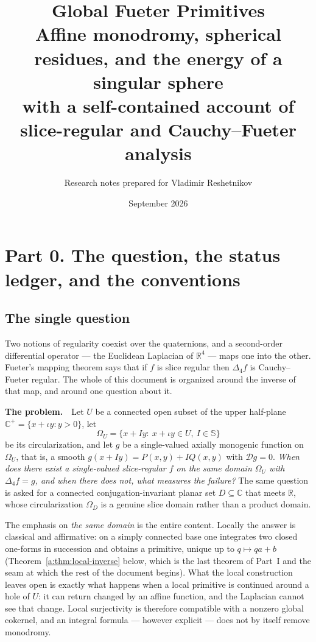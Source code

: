 \documentclass[11pt,a4paper]{article}
\title{\textbf{Global Fueter Primitives}\\[4pt]
\large Affine monodromy, spherical residues, and the energy of a singular
sphere\\[2pt]
\normalsize with a self-contained account of slice-regular and
Cauchy--Fueter analysis}
\author{Research notes prepared for Vladimir Reshetnikov}
\date{September 2026}
\numberwithin{equation}{section}
\theoremstyle{definition}
\theoremstyle{remark}
\theoremstyle{plain}
\newcommand{\RR}{\mathbb R}
\newcommand{\CC}{\mathbb C}
\newcommand{\SSS}{\mathbb S}
\newcommand{\Cplus}{\CC^{+}}
\newcommand{\Dop}{\mathcal D}
\newcommand{\lap}{\Delta_4}
\newcommand{\Om}{\Omega}
\begin{document}
\maketitle
\setcounter{tocdepth}{2}
\tableofcontents
\clearpage



\section{Part 0. The question, the status ledger, and the conventions}
\label{a:sec:front}

\subsection{The single question}
\label{a:sec:question}

Two notions of regularity coexist over the quaternions, and a second-order
differential operator --- the Euclidean Laplacian of $\RR^4$ --- maps one into
the other. Fueter's mapping theorem says that if $f$ is slice regular then
$\lap f$ is Cauchy--Fueter regular. The whole of this document is organized
around the inverse of that map, and around one question about it.

\medskip
\noindent\textbf{The problem.}\ \ Let $U$ be a connected open subset of the
upper half-plane $\Cplus=\{x+\iota y: y>0\}$, let
\[
 \Om_U=\{x+Iy:\ x+\iota y\in U,\ I\in\SSS\}
\]
be its circularization, and let $g$ be a single-valued axially monogenic
function on $\Om_U$, that is, a smooth $g(x+Iy)=P(x,y)+IQ(x,y)$ with
$\Dop g=0$. \emph{When does there exist a single-valued slice-regular $f$ on
the same domain $\Om_U$ with $\lap f=g$, and when there does not, what
measures the failure?} The same question is asked for a connected
conjugation-invariant planar set $D\subseteq\CC$ that meets $\RR$, whose
circularization $\Om_D$ is a genuine slice domain rather than a product
domain.

\medskip
The emphasis on \emph{the same domain} is the entire content. Locally the
answer is classical and affirmative: on a simply connected base one integrates
two closed one-forms in succession and obtains a primitive, unique up to
$q\mapsto qa+b$ (Theorem~\ref{a:thm:local-inverse} below, which is the last
theorem of Part~I and the seam at which the rest of the document begins).
What the local construction leaves open is exactly what happens when a local
primitive is continued around a hole of $U$: it can return changed by an
affine function, and the Laplacian cannot see that change. Local surjectivity
is therefore compatible with a nonzero global cokernel, and an integral
formula --- however explicit --- does not by itself remove monodromy.
\end{document}

